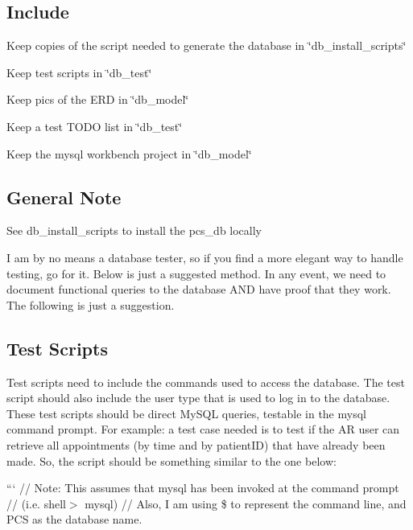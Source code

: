 \subsection*{Include}


\begin{DoxyEnumerate}
\item Keep copies of the script needed to generate the database in \char`\"{}db\-\_\-install\-\_\-scripts\char`\"{}
\item Keep test scripts in \char`\"{}db\-\_\-test\char`\"{}
\item Keep pics of the E\-R\-D in \char`\"{}db\-\_\-model\char`\"{}
\item Keep a test T\-O\-D\-O list in \char`\"{}db\-\_\-test\char`\"{}
\item Keep the mysql workbench project in \char`\"{}db\-\_\-model\char`\"{}
\end{DoxyEnumerate}

\subsection*{General Note}

See db\-\_\-install\-\_\-scripts to install the pcs\-\_\-db locally

I am by no means a database tester, so if you find a more elegant way to handle testing, go for it. Below is just a suggested method. In any event, we need to document functional queries to the database A\-N\-D have proof that they work. The following is just a suggestion.

\subsection*{Test Scripts}

Test scripts need to include the commands used to access the database. The test script should also include the user type that is used to log in to the database. These test scripts should be direct My\-S\-Q\-L queries, testable in the mysql command prompt. For example\-: a test case needed is to test if the A\-R user can retrieve all appointments (by time and by patient\-I\-D) that have already been made. So, the script should be something similar to the one below\-:

``` // Note\-: This assumes that mysql has been invoked at the command prompt // (i.\-e. shell$>$ mysql) // Also, I am using \$ to represent the command line, and P\-C\-S as the database name.

